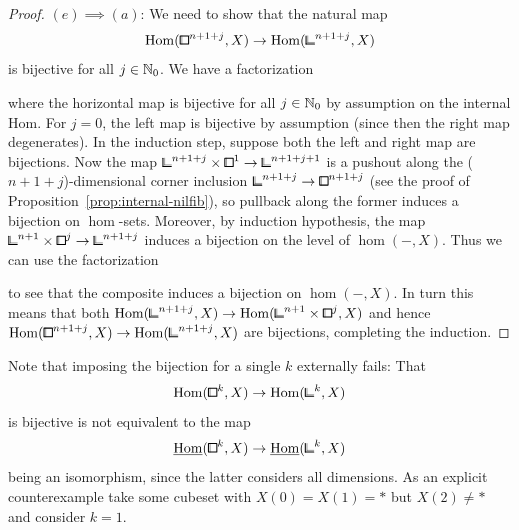 \begin{proof}
    $(e)\implies(a)$:
    We need to show that the natural map
    \[
        \hom({\bbox}^{n+1+j},X)\to\hom({\bbcor}^{n+1+j},X)
    \]
    is bijective for all $j\in{\mathbb{N}}_0$.
    We have a factorization
    \begin{center}
    \end{center}
    where the horizontal map is bijective for all $j\in{\mathbb{N}}_0$ by assumption on the internal Hom.
    For $j=0$, the left map is bijective by assumption (since then the right map degenerates).
    In the induction step, suppose both the left and right map are bijections.
    Now the map ${\bbcor}^{n+1+j}\times{\bbox}^1\to{\bbcor}^{n+1+j+1}$ is a pushout
    along the ($n+1+j$)-dimensional corner inclusion ${\bbcor}^{n+1+j}\to{\bbox}^{n+1+j}$
    (see the proof of Proposition~\ref{prop:internal-nilfib}),
    so pullback along the former induces a bijection on $\hom$-sets.
    Moreover, by induction hypothesis, the map ${\bbcor}^{n+1}\times{\bbox}^j\to{\bbcor}^{n+1+j}$
    induces a bijection on the level of $\hom(-,X)$.
    Thus we can use the factorization
    \begin{center}
    \end{center}
    to see that the composite induces a bijection on $\hom(-,X)$.
    In turn this means that both $\hom({\bbcor}^{n+1+j},X)\to\hom({\bbcor}^{n+1}\times{\bbox}^j,X)$
    and hence $\hom({\bbox}^{n+1+j},X)\to\hom({\bbcor}^{n+1+j},X)$ are bijections, completing the induction.
\end{proof}

\begin{remark}
	Note that imposing the bijection for a single $k$ externally fails:
	That
	\[\hom({\bbox}^k,X)\to \hom({\bbcor}^k,X)\]
	is bijective is not equivalent to the map
    \[\ihom({\bbox}^k,X)\to \ihom({\bbcor}^k,X)\]
    being an isomorphism,
    since the latter considers all dimensions.
	As an explicit counterexample take some cubeset with $X(0)=X(1)=\ast$ but $X(2)\ne \ast$ and consider
	$k=1$.
\end{remark}


